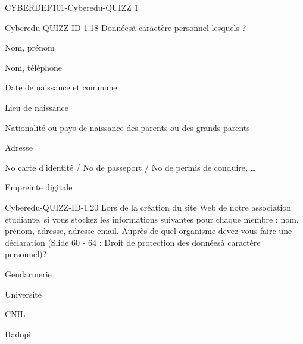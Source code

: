 \documentclass[12pt]{article}
\begin{document}
\begin{quiz}{CYBERDEF101-Cyberedu-QUIZZ 1}
\begin{multi}[multiple=true]{Cyberedu-QUIZZ-ID-1.18}
	 Donn\'ees\`a caract\`ere personnel lesquels ?
\item*	Nom, pr\'enom
\item* 	Nom, t\'el\'ephone
\item* 	Date de naissance et commune
\item* 	Lieu de naissance
\item* 	Nationalit\'e ou pays de naissance des parents ou des grands parents
\item* 	Adresse
\item* 	No carte d'identit\'e / No de passeport / No de permis de conduire, …
\item* 	Empreinte digitale
\end{multi}

\begin{multi}[multiple=true]{Cyberedu-QUIZZ-ID-1.20}
	Lors de la cr\'eation du site Web de notre association \'etudiante, si vous stockez les informations suivantes pour chaque membre : nom, pr\'enom, adresse, adresse email. Aupr\`es de quel organisme devez-vous faire une d\'eclaration (Slide 60 - 64 : Droit de protection des donn\'ees\`a caract\`ere personnel)?
\item 	Gendarmerie
\item 	Universit\'e
\item* 	CNIL
\item 	Hadopi
\end{multi}
  \end{quiz}
   
\end{document}
